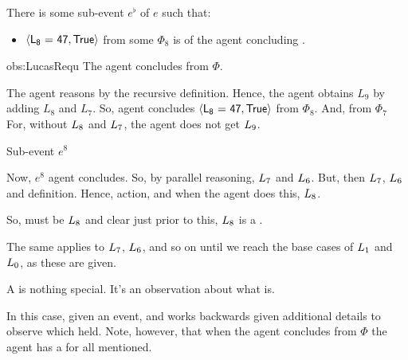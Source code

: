 \begin{note}
  \begin{observation}%
    \label{obs:LucasRequ}%
    There is some sub-event \(e^{\flat}\) of \(e\) such that:
    \begin{itemize}
    \item
      \(\pv{\propI{L\textsubscript{8} = 47}}{\valI{True}}\) from some \pool{} \(\Phi_{8}\) is  of the agent concluding .
    \end{itemize}
  \end{observation}

  \begin{motivation}{obs:LucasRequ}
    The agent concludes  from \(\Phi\).

    The agent reasons by the recursive definition.
    Hence, the agent obtains \(L_{9}\) by adding \(L_{8}\) and \(L_{7}\).
    So, agent concludes \(\pv{\propI{L\textsubscript{8} = 47}}{\valI{True}}\) from \(\Phi_{8}\).
    And,  from \(\Phi_{7}\)
    For, without \(L\textsubscript{8}\) and \(L\textsubscript{7}\), the agent does not get \(L\textsubscript{9}\).

    Sub-event \(e^{8}\)

    Now, \(e^{8}\) agent concludes.
    So, by parallel reasoning, \(L\textsubscript{7}\) and \(L\textsubscript{6}\).
    But, then \(L\textsubscript{7}\), \(L\textsubscript{6}\) and definition.
    Hence, action, and when the agent does this, \(L\textsubscript{8}\).

    So, must be \(L\textsubscript{8}\) and clear just prior to this, \(L\textsubscript{8}\) is a \fc{}.
  \end{motivation}

  The same applies to \(L\textsubscript{7}\), \(L\textsubscript{6}\), and so on until we reach the base cases of \(L\textsubscript{1}\) and \(L\textsubscript{0}\), as these are given.
\end{note}

\begin{note}
  A \requ{} is nothing special.
  It's an observation about what is.

  In this case, given an event, and works backwards given additional details to observe which  held.
  Note, however, that when the agent concludes  from \(\Phi\) the agent has a \wit{} for all \ros{} mentioned.
\end{note}

